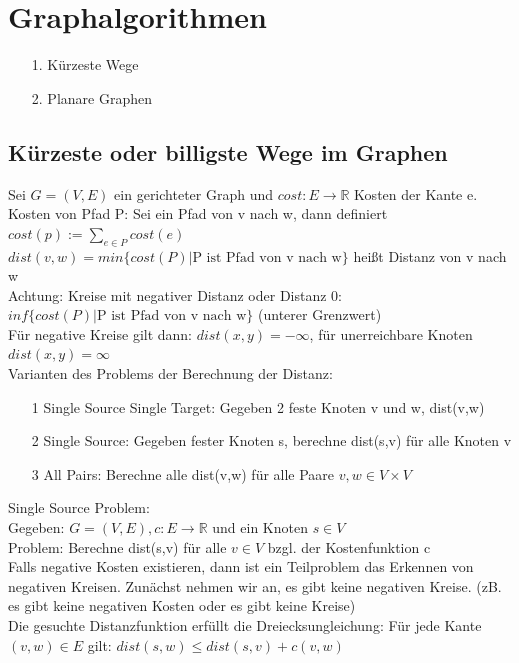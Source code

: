 \documentclass[a4paper]{article}
\begin{document}
\section{Graphalgorithmen}
\begin{itemize}
\item[1.] Kürzeste Wege
\item[2.] Planare Graphen
\end{itemize}
\subsection{Kürzeste oder billigste Wege im Graphen}
Sei $G=(V,E)$ ein gerichteter Graph und $cost:E\rightarrow \mathbb{R}$ Kosten der Kante e.\\
Kosten von Pfad P: Sei ein Pfad von v nach w, dann definiert $cost(p):=\sum_{e\in P}cost(e)$\\
$dist(v,w)=min\{cost(P)|\text{P ist Pfad von v nach w}\}$ heißt Distanz von v nach w\\
Achtung: Kreise mit negativer Distanz oder Distanz 0: $inf\{cost(P)|\text{P ist Pfad von v nach w}\}$ (unterer Grenzwert)\\
Für negative Kreise gilt dann: $dist(x,y)=-\infty$, für unerreichbare Knoten $dist(x,y)=\infty$\\
Varianten des Problems der Berechnung der Distanz:\\
\begin{itemize}
\item[1] Single Source Single Target: Gegeben 2 feste Knoten v und w, dist(v,w)
\item[2] Single Source: Gegeben fester Knoten s, berechne dist(s,v) für alle Knoten v
\item[3] All Pairs: Berechne alle dist(v,w) für alle Paare $v,w\in V\times V$
\end{itemize}
Single Source Problem:\\
Gegeben: $G=(V,E), c:E\rightarrow\mathbb{R}$ und ein Knoten $s\in V$\\
Problem: Berechne dist(s,v) für alle $v\in V$ bzgl. der Kostenfunktion c\\
Falls negative Kosten existieren, dann ist ein Teilproblem das Erkennen von negativen Kreisen. Zunächst nehmen wir an, es gibt keine negativen Kreise. (zB. es gibt keine negativen Kosten oder es gibt keine Kreise)\\
Die gesuchte Distanzfunktion erfüllt die Dreiecksungleichung: Für jede Kante $(v,w)\in E$ gilt:
$dist(s,w)\leq dist(s,v)+c(v,w)$\\
\end{document}
